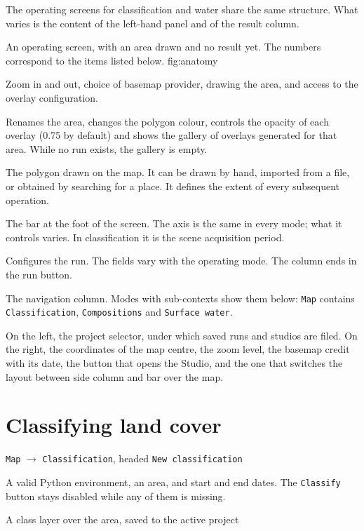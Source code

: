 \documentclass[12pt,a4paper]{article}
\begin{document}
The operating screens for classification and water share the same
structure. What varies is the content of the left-hand panel and of the
result column.

  {An operating screen, with an area drawn and no result yet. The numbers
   correspond to the items listed below.}
  {fig:anatomy}

 Zoom in and out, choice of basemap provider, drawing
the area, and access to the overlay configuration.

 Renames the area, changes the polygon
colour, controls the opacity of each overlay (0.75 by default) and shows the
gallery of overlays generated for that area. While no run exists, the gallery
is empty.

 The polygon drawn on the map. It can be
drawn by hand, imported from a file, or obtained by searching for a place. It
defines the extent of every subsequent operation.

 The bar at the foot of the screen. The axis is
the same in every mode; what it controls varies. In classification it is the
scene acquisition period.

 Configures the run. The fields vary with the
operating mode. The column ends in the run button.

 The navigation column. Modes with
sub-contexts show them below: \texttt{Map} contains \texttt{Classification},
\texttt{Compositions} and \texttt{Surface water}.

 On the left, the project selector, under which saved
runs and studios are filed. On the right, the coordinates of the map centre,
the zoom level, the basemap credit with its date, the button that opens the
Studio, and the one that switches the layout between side column and bar over
the map.

\section{Classifying land cover}

\begin{ficha}
  \item[Panel] \texttt{Map} $\rightarrow$ \texttt{Classification}, headed
        \texttt{New classification}
  \item[Preconditions] A valid Python environment, an area, and start and end
        dates. The \texttt{Classify} button stays disabled while any of them is
        missing.
  \item[Output] A class layer over the area, saved to the active project
\end{ficha}
\end{document}
